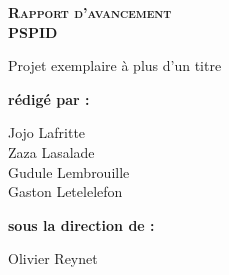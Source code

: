 
\begingroup
\thispagestyle{empty}
\begin{center}
\vspace*{3cm}
{\Huge \textsc{\textbf{Rapport d'avancement}}}\\
\vspace*{1cm}
{\Huge \textbf{PSPID}}\par %
\vspace*{1cm}
{\huge Projet exemplaire à plus d'un titre}\par %
\end{center}
\vspace*{6cm}

\hspace*{6cm}
\textbf{\huge rédigé par :} 
\begin{flushright}
{
\huge
Jojo Lafritte\\
Zaza Lasalade\\
Gudule Lembrouille\\
 Gaston Letelelefon\\
}
\end{flushright}
\vspace*{1cm}
\hspace*{6cm}
{\huge \textbf{sous la direction de :}}\\
\begin{flushright}
{\huge
Olivier Reynet\\
}
\end{flushright}
\endgroup
